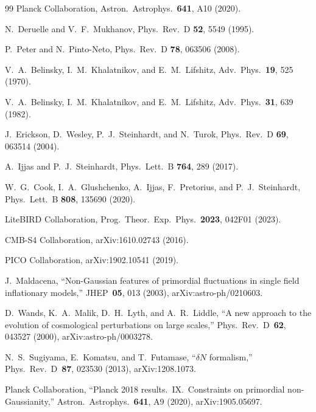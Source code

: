 \documentclass[11pt,a4paper]{article}
\begin{document}
\begin{thebibliography}{99}
Planck Collaboration,
Astron.\ Astrophys.\ \textbf{641}, A10 (2020).

N.~Deruelle and V.~F.~Mukhanov,
Phys.\ Rev.\ D \textbf{52}, 5549 (1995).

P.~Peter and N.~Pinto-Neto,
Phys.\ Rev.\ D \textbf{78}, 063506 (2008).

V.~A.~Belinsky, I.~M.~Khalatnikov, and E.~M.~Lifshitz,
Adv.\ Phys.\ \textbf{19}, 525 (1970).

V.~A.~Belinsky, I.~M.~Khalatnikov, and E.~M.~Lifshitz,
Adv.\ Phys.\ \textbf{31}, 639 (1982).

J.~Erickson, D.~Wesley, P.~J.~Steinhardt, and N.~Turok,
Phys.\ Rev.\ D \textbf{69}, 063514 (2004).

A.~Ijjas and P.~J.~Steinhardt,
Phys.\ Lett.\ B \textbf{764}, 289 (2017).

W.~G.~Cook, I.~A.~Glushchenko, A.~Ijjas, F.~Pretorius, and P.~J.~Steinhardt,
Phys.\ Lett.\ B \textbf{808}, 135690 (2020).

LiteBIRD Collaboration,
Prog.\ Theor.\ Exp.\ Phys.\ \textbf{2023}, 042F01 (2023).

CMB-S4 Collaboration,
arXiv:1610.02743 (2016).

PICO Collaboration,
arXiv:1902.10541 (2019).

J.~Maldacena,
``Non-Gaussian features of primordial fluctuations in single field inflationary models,''
JHEP~\textbf{05}, 013 (2003), arXiv:astro-ph/0210603.

D.~Wands, K.~A.~Malik, D.~H.~Lyth, and A.~R.~Liddle,
``A new approach to the evolution of cosmological perturbations on large scales,''
Phys.~Rev.~D~\textbf{62}, 043527 (2000), arXiv:astro-ph/0003278.

N.~S.~Sugiyama, E.~Komatsu, and T.~Futamase,
``$\delta N$ formalism,''
Phys.~Rev.~D~\textbf{87}, 023530 (2013), arXiv:1208.1073.

Planck Collaboration,
``Planck 2018 results.~IX.~Constraints on primordial non-Gaussianity,''
Astron.~Astrophys.~\textbf{641}, A9 (2020), arXiv:1905.05697.

\end{thebibliography}
\end{document}
